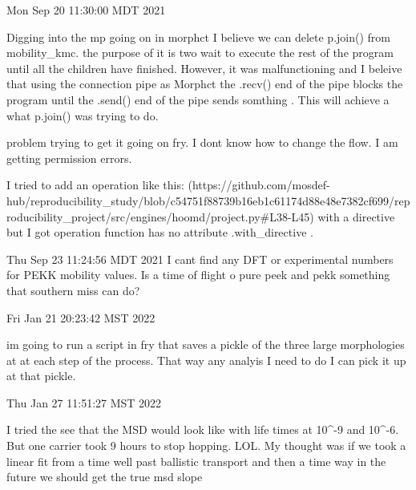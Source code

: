 Mon Sep 20 11:30:00 MDT 2021
    
    Digging into the mp going on in morphct I believe we can delete p.join() from 
    mobility_kmc. the purpose of it is two wait to execute the rest of the program
    until all the children have finished. However, it was malfunctioning and I beleive
    that using the connection pipe as Morphct the .recv() end of the pipe blocks the
    program until the .send() end of the pipe sends somthing . This will achieve 
    a what p.join() was trying to do. 

    problem trying to get it going on fry. I dont know how to change the flow. 
    I am getting permission errors. 

    I tried to add an operation like this: 
    (https://github.com/mosdef-hub/reproducibility_study/blob/c54751f88739b16eb1c61174d88e48e7382cf699/reproducibility_project/src/engines/hoomd/project.py#L38-L45)
    with a directive but I got operation function has no
    attribute .with_directive .
    
Thu Sep 23 11:24:56 MDT 2021
    I cant find any DFT or experimental numbers for PEKK mobility values. Is a time of flight o
    pure peek and pekk something that southern miss can do?
        
Fri Jan 21 20:23:42 MST 2022
    
    im going to run a script in fry that saves a pickle of the three large morphologies at at each step of the 
    process. That way any analyis I need to do I can pick it up at that pickle. 

Thu Jan 27 11:51:27 MST 2022

    I tried the see that the MSD would look like with life times at 10^-9 and 10^-6. But one carrier took 9
    hours to stop hopping. LOL. My thought was if we took a linear fit from a time well past ballistic
    transport and then a time way in the future we should get the true msd slope 
